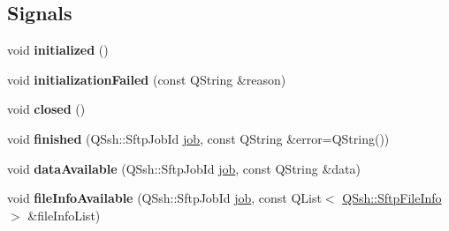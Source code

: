 \subsection*{Signals}
\begin{DoxyCompactItemize}
\item 
\mbox{\label{class_q_ssh_1_1_sftp_channel_a755193c1620368b58c91784117a0c27b}} 
void {\bfseries initialized} ()
\item 
\mbox{\label{class_q_ssh_1_1_sftp_channel_abbb2ba7d8de4100914cf15389919d783}} 
void {\bfseries initialization\+Failed} (const Q\+String \&reason)
\item 
\mbox{\label{class_q_ssh_1_1_sftp_channel_aa4a457aca6115681dce24fa29b78b091}} 
void {\bfseries closed} ()
\item 
\mbox{\label{class_q_ssh_1_1_sftp_channel_acf1f71f422d79ef808f5ca0f22a8e408}} 
void {\bfseries finished} (Q\+Ssh\+::\+Sftp\+Job\+Id \mbox{\hyperlink{structjob}{job}}, const Q\+String \&error=Q\+String())
\item 
\mbox{\label{class_q_ssh_1_1_sftp_channel_a5f329efaf41c23b5420e0e0893f4b266}} 
void {\bfseries data\+Available} (Q\+Ssh\+::\+Sftp\+Job\+Id \mbox{\hyperlink{structjob}{job}}, const Q\+String \&data)
\item 
\mbox{\label{class_q_ssh_1_1_sftp_channel_a390ca2ad6c9e93cf5a99ea9d17720465}} 
void {\bfseries file\+Info\+Available} (Q\+Ssh\+::\+Sftp\+Job\+Id \mbox{\hyperlink{structjob}{job}}, const Q\+List$<$ \mbox{\hyperlink{class_q_ssh_1_1_sftp_file_info}{Q\+Ssh\+::\+Sftp\+File\+Info}} $>$ \&file\+Info\+List)
\end{DoxyCompactItemize}
